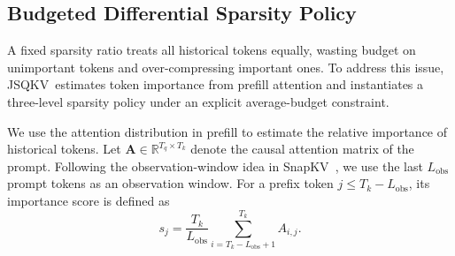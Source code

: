 \documentclass[runningheads]{llncs}
\newcommand{\method}{JSQKV}
\begin{document}

\subsection{Budgeted Differential Sparsity Policy}
\label{sec:diff-sparsity}

A fixed sparsity ratio treats all historical tokens equally, wasting budget on unimportant tokens and over-compressing important ones. To address this issue, \method\ estimates token importance from prefill attention and instantiates a three-level sparsity policy under an explicit average-budget constraint.

We use the attention distribution in prefill to estimate the relative importance of historical tokens. Let $\mathbf{A} \in \mathbb{R}^{T_q \times T_k}$ denote the causal attention matrix of the prompt. Following the observation-window idea in SnapKV~\cite{snapkv}, we use the last $L_{\text{obs}}$ prompt tokens as an observation window. For a prefix token $j \leq T_k - L_{\text{obs}}$, its importance score is defined as
\begin{equation}
s_j = \frac{T_k}{L_{\text{obs}}}
\sum_{i=T_k-L_{\text{obs}}+1}^{T_k} A_{i,j}.
\label{eq:importance}
\end{equation}
\end{document}

